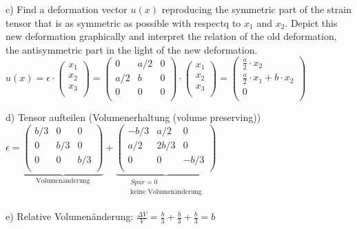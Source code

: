 \documentclass[a4paper]{scrartcl}
\begin{document}
c) Find a deformation vector $u(x)$ reproducing the symmetric part of the strain
tensor that is as symmetric as possible with respectq to $x_1$ and $x_2$. Depict
this new deformation graphically and interpret the relation of the old
deformation, the antisymmetric part in the light of the new deformation.\\

$u(x) = \epsilon \cdot \begin{pmatrix} x_1\\ x_2\\ x_3\\ \end{pmatrix} =
\begin{pmatrix} 0 & a/2 & 0\\
a/2 & b & 0\\
0 & 0 & 0\\
\end{pmatrix} \cdot \begin{pmatrix} x_1\\ x_2\\ x_3\\ \end{pmatrix} =
\begin{pmatrix}
\frac{a}{2} \cdot x_2\\ \frac{a}{2} \cdot x_1 + b \cdot x_2\\ 0\\ \end{pmatrix}$

d) Tensor aufteilen (Volumenerhaltung (volume preserving))\\
$\epsilon =
\underbrace{
\begin{pmatrix}
b/3 & 0 & 0\\
0 & b/3 & 0\\
0 & 0 & b/3\\
\end{pmatrix}
}_{\text{Volumenänderung}} +
\underbrace {
\begin{pmatrix}
-b/3 & a/2 & 0\\
a/2 & 2b/3 & 0\\
0 & 0 & -b/3\\
\end{pmatrix}}_{\begin{matrix} Spur = 0\\ \text{keine Volumenänderung}\\
\end{matrix}}$

e) Relative Volumenänderung: $\frac{\Delta V}{V} = \frac{b}{3} + \frac{b}{3} +
\frac{b}{3} = b$
\end{document}
